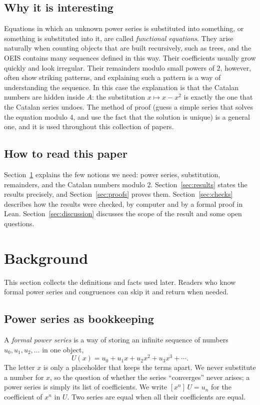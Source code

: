 \documentclass[11pt,a4paper]{article}
\theoremstyle{definition}
\theoremstyle{remark}
\newcommand{\coeff}[2]{[x^{#1}]\,#2}
\begin{document}
\subsection{Why it is interesting}
Equations in which an unknown power series is substituted into something, or something is substituted into it, are
called \emph{functional equations}. They arise naturally when counting objects that are built recursively, such as trees,
and the OEIS contains many sequences defined in this way. Their coefficients usually grow quickly and look irregular.
Their remainders modulo small powers of $2$, however, often show striking patterns, and explaining such a pattern is a
way of understanding the sequence. In this case the explanation is that the Catalan numbers are hidden inside $A$: the
substitution $x\mapsto x-x^2$ is exactly the one that the Catalan series undoes. The method of proof (guess a simple
series that solves the equation modulo $4$, and use the fact that the solution is unique) is a general one, and it is
used throughout this collection of papers.

\subsection{How to read this paper}
Section~\ref{sec:background} explains the few notions we need: power series, substitution, remainders, and the
Catalan numbers modulo $2$. Section~\ref{sec:results} states the results precisely, and Section~\ref{sec:proofs} proves
them. Section~\ref{sec:checks} describes how the results were checked, by computer and by a formal proof in Lean.
Section~\ref{sec:discussion} discusses the scope of the result and some open questions.
\section{Background}\label{sec:background}
This section collects the definitions and facts used later. Readers who know formal power series and congruences can skip it and return when needed.
\subsection{Power series as bookkeeping}
A \emph{formal power series} is a way of storing an infinite sequence of numbers $u_0,u_1,u_2,\dots$ in one object,
\[
U(x)=u_0+u_1x+u_2x^2+u_3x^3+\cdots .
\]
The letter $x$ is only a placeholder that keeps the terms apart. We never substitute a number for $x$, so the question
of whether the series ``converges'' never arises; a power series is simply its list of coefficients. We write
$\coeff{n}{U}=u_n$ for the coefficient of $x^n$ in $U$. Two series are equal when all their coefficients are equal.
\end{document}
